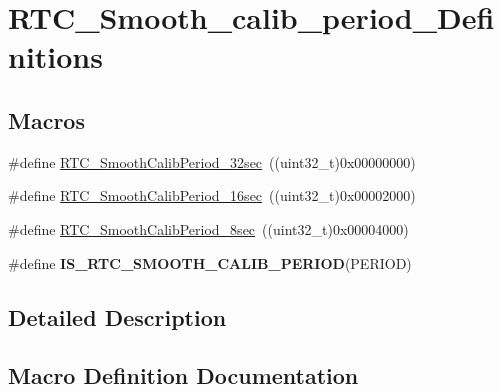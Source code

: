 \hypertarget{group___r_t_c___smooth__calib__period___definitions}{}\section{R\+T\+C\+\_\+\+Smooth\+\_\+calib\+\_\+period\+\_\+\+Definitions}
\label{group___r_t_c___smooth__calib__period___definitions}
\subsection*{Macros}
\begin{DoxyCompactItemize}
\item 
\#define \hyperlink{group___r_t_c___smooth__calib__period___definitions_ga1410c28a3644ce52dfbdf2f21a037eef}{R\+T\+C\+\_\+\+Smooth\+Calib\+Period\+\_\+32sec}~((uint32\+\_\+t)0x00000000)
\item 
\#define \hyperlink{group___r_t_c___smooth__calib__period___definitions_ga31b86cd48a0ef55f1837ab5175c52eb9}{R\+T\+C\+\_\+\+Smooth\+Calib\+Period\+\_\+16sec}~((uint32\+\_\+t)0x00002000)
\item 
\#define \hyperlink{group___r_t_c___smooth__calib__period___definitions_ga8a34f8b7e145649bad2ec36b69eccbd3}{R\+T\+C\+\_\+\+Smooth\+Calib\+Period\+\_\+8sec}~((uint32\+\_\+t)0x00004000)
\item 
\#define {\bfseries I\+S\+\_\+\+R\+T\+C\+\_\+\+S\+M\+O\+O\+T\+H\+\_\+\+C\+A\+L\+I\+B\+\_\+\+P\+E\+R\+I\+O\+D}(P\+E\+R\+I\+O\+D)
\end{DoxyCompactItemize}


\subsection{Detailed Description}


\subsection{Macro Definition Documentation}
\hypertarget{group___r_t_c___smooth__calib__period___definitions_ga65c64189fd22cb803ffe35cce640071a}{}
